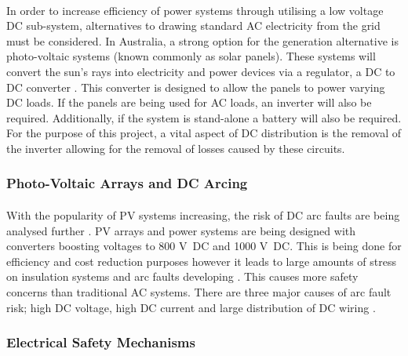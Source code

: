 \paragraph{}
In order to increase efficiency of power systems through utilising a low voltage DC sub-system, alternatives to drawing standard AC electricity from the grid must be considered. In Australia, a strong option for the generation alternative is photo-voltaic systems (known commonly as solar panels). These systems will convert the sun’s rays into electricity and power devices via a regulator, a DC to DC converter \cite{Pillay2004}. This converter is designed to allow the panels to power varying DC loads. If the panels are being used for AC loads, an inverter will also be required. Additionally, if the system is stand-alone a battery will also be required. For the purpose of this project, a vital aspect of DC distribution is the removal of the inverter allowing for the removal of losses caused by these circuits.   

\subsubsection{Photo-Voltaic Arrays and DC Arcing}

\paragraph{}
With the popularity of PV systems increasing, the risk of DC arc faults are being analysed further \cite{Spooner2008}. PV arrays and power systems are being designed with converters boosting voltages to 800 \si{V DC} and 1000 \si{V DC}. This is being done for efficiency and cost reduction purposes however it leads to large amounts of stress on insulation systems and arc faults developing \cite{Spooner2008}. This causes more safety concerns than traditional AC systems. There are three major causes of arc fault risk; high DC voltage, high DC current and large distribution of DC wiring \cite{website:DC-Arching}.        

\subsubsection{Electrical Safety Mechanisms}

